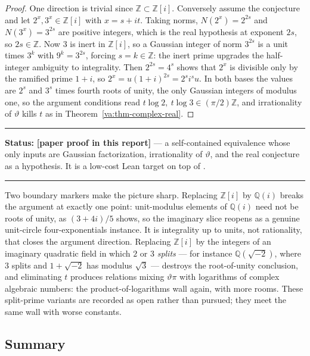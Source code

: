 \documentclass[11pt,oneside]{article}
\theoremstyle{definition}
\theoremstyle{remark}
\newcommand{\Z}{\mathbb Z}
\newcommand{\Q}{\mathbb Q}
\newcommand{\thetaq}{\vartheta}
\newcommand{\lean}[1]{\texttt{\detokenize{#1}}}
\newcommand{\statusnew}{\textcolor{newgreen}{\textbf{[paper proof in this report]}}}
\newenvironment{statusbox}[1]
{\begin{center}\begin{minipage}{0.94\textwidth}\raggedright\hbadness=10000\hrule
\vspace{0.45em}\textbf{Status:} #1\par\vspace{0.35em}}
{\vspace{0.35em}\hrule\end{minipage}\end{center}}
\begin{document}
\begin{proof}
One direction is trivial since $\Z\subset\Z[i]$.  Conversely assume the conjecture and let
$2^x,3^x\in\Z[i]$ with $x=s+it$.  Taking norms, $N(2^x)=2^{2s}$ and $N(3^x)=3^{2s}$ are
positive integers, which is the real hypothesis at exponent $2s$, so $2s\in\Z$.  Now $3$ is
inert in $\Z[i]$, so a Gaussian integer of norm $3^{2s}$ is a unit times $3^{k}$ with
$9^{k}=3^{2s}$, forcing $s=k\in\Z$: the inert prime upgrades the half-integer ambiguity to
integrality.  Then $2^{2s}=4^{s}$ shows that $2^x$ is divisible only by the ramified prime
$1+i$, so $2^x=u(1+i)^{2s}=2^{s}i^{s}u$.  In both bases the values are $2^{s}$ and $3^{s}$
times fourth roots of unity, the only Gaussian integers of modulus one, so the argument
conditions read $t\log2,\ t\log3\in(\pi/2)\Z$, and irrationality of $\thetaq$ kills $t$ as in
Theorem~\ref{va:thm-complex-real}.
\end{proof}

\begin{statusbox}{\statusnew{} --- a self-contained equivalence whose only inputs are Gaussian
factorization, irrationality of $\thetaq$, and the real conjecture as a hypothesis.  It is a
low-cost Lean target on top of \lean{ComplexSolutions}.}
\end{statusbox}

Two boundary markers make the picture sharp.  Replacing $\Z[i]$ by $\Q(i)$ breaks the argument
at exactly one point: unit-modulus elements of $\Q(i)$ need not be roots of unity, as
$(3+4i)/5$ shows, so the imaginary slice reopens as a genuine unit-circle four-exponentials
instance.  It is integrality up to units, not rationality, that closes the argument direction.
Replacing $\Z[i]$ by the integers of an imaginary quadratic field in which $2$ or $3$
\emph{splits} --- for instance $\Q(\sqrt{-2})$, where $3$ splits and $1+\sqrt{-2}$ has modulus
$\sqrt3$ --- destroys the root-of-unity conclusion, and eliminating $t$ produces relations
mixing $\thetaq\pi$ with logarithms of complex algebraic numbers: the product-of-logarithms
wall again, with more rooms.  These split-prime variants are recorded as open rather than
pursued; they meet the same wall with worse constants.

\subsection{Summary}
\end{document}
